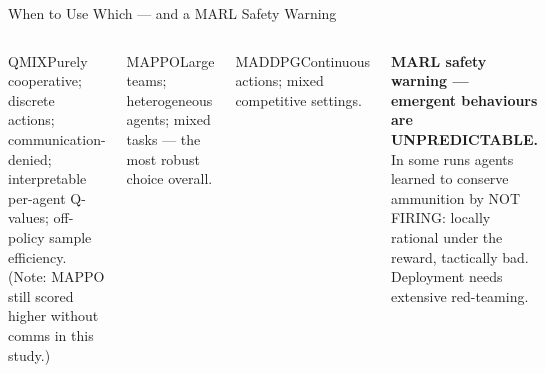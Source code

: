\documentclass[aspectratio=169,10pt,t]{beamer}
\begin{document}
\begin{frame}{When to Use Which --- and a MARL Safety Warning}
\begin{columns}[T]
\begin{cbox}[ISSAblue]{QMIX}\scriptsize Purely cooperative; discrete actions; communication-denied; interpretable per-agent Q-values; off-policy sample efficiency. (Note: MAPPO still scored higher without comms in this study.)\end{cbox}
\begin{cbox}[AccentCol]{MAPPO}\scriptsize Large teams; heterogeneous agents; mixed tasks --- the most robust choice overall.\end{cbox}
\begin{cbox}[ISSAred]{MADDPG}\scriptsize Continuous actions; mixed competitive settings.\end{cbox}
\begin{wbox}\scriptsize\textbf{MARL safety warning --- emergent behaviours are UNPREDICTABLE.} In some runs agents learned to conserve ammunition by NOT FIRING: locally rational under the reward, tactically bad. Deployment needs extensive red-teaming.\end{wbox}
\end{columns}
\end{frame}
\end{document}
